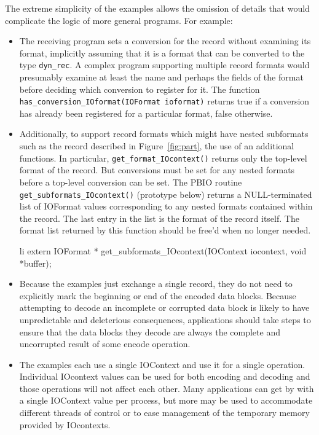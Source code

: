 \documentclass{article}
\begin{document}
The extreme simplicity of the examples allows the omission of details that
would complicate the logic of more general programs.  For example:
\begin{itemize}
\item The receiving program sets a conversion for the record without examining
its format, implicitly assuming that it is a format that can be converted to
the type {\tt dyn\_rec}.  A complex program supporting multiple record
formats would presumably examine at least the name and perhaps the fields of
the format before deciding which conversion to register for it.  The function
{\tt has\_conversion\_IOformat(IOFormat~ioformat)} returns true if a
conversion has already been registered for a particular format, false
otherwise. 
\item Additionally, to support record formats which might have nested
subformats such as the record described in Figure~\ref{fig:part}, the use of
an additional functions.  In particular, {\tt get\_format\_IOcontext()}
returns only the top-level format of the record.  But conversions must be set
for any nested formats before a top-level conversion can be set.  The PBIO
routine {\tt get\_subformats\_IOcontext()} (prototype below) returns a
NULL-terminated list of IOFormat values corresponding to any nested formats
contained within the record.  The last entry in the list is the format of the
record itself.  The format list returned by this function should be free'd
when no longer needed.
\begin{code}{li}
extern IOFormat *
get_subformats_IOcontext(IOContext iocontext, void *buffer);
\end{code}

\item Because the examples just exchange a single record, they do not need to
explicitly mark the beginning or end of the encoded data blocks.  Because
attempting to decode an incomplete or corrupted data block is likely to have
unpredictable and deleterious consequences, applications should take steps to
ensure that the data blocks they decode are always the complete and
uncorrupted result of some encode operation.
\item The examples each use a single IOContext and use it for a single
operation.  Individual IOcontext values can be used for both encoding and
decoding and those operations will not affect each other.  Many applications
can get by with a single IOContext value per process, but more may be used to
accommodate different threads of control or to ease management of the temporary
memory provided by IOcontexts.
\end{itemize}
\end{document}
